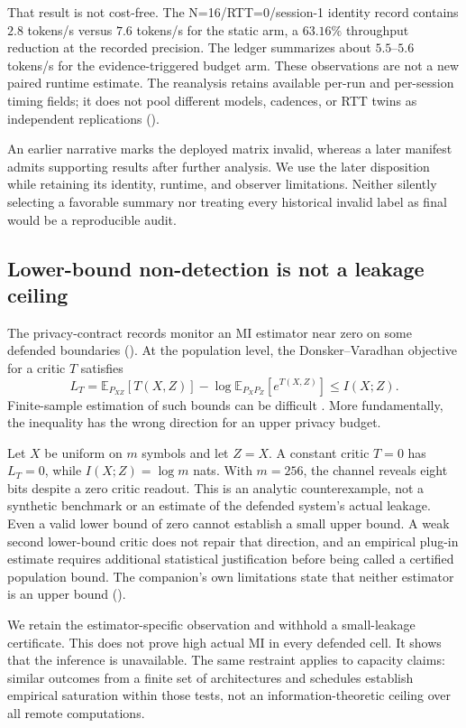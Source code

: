 That result is not cost-free. The N=16/RTT=0/session-1 identity record
contains $2.8$ tokens/s versus $7.6$ tokens/s for the static arm, a
$63.16\%$ throughput reduction at the recorded precision. The ledger
summarizes about $5.5$--$5.6$ tokens/s for the evidence-triggered budget
arm. These observations are not a new paired runtime estimate. The
reanalysis retains available per-run and
per-session timing fields; it does not pool different models, cadences,
or RTT twins as independent replications ().

An earlier narrative marks the deployed matrix invalid, whereas a later
manifest admits supporting results after further analysis. We use the
later disposition while retaining its identity, runtime, and observer
limitations. Neither silently selecting a favorable summary nor treating
every historical invalid label as final would be a reproducible audit.

\subsection{Lower-bound non-detection is not a leakage ceiling}

The privacy-contract records monitor an MI estimator near zero on some
defended boundaries (). At the population level, the
Donsker--Varadhan objective for a critic $T$ satisfies
\begin{equation}
 L_T=\mathbb E_{P_{XZ}}[T(X,Z)]-
 \log\mathbb E_{P_XP_Z}[e^{T(X,Z)}]\le I(X;Z).
 \label{eq:dv}
\end{equation}
Finite-sample estimation of such bounds can be difficult
\citep{song2020,mcallester2020}. More fundamentally, the inequality has
the wrong direction for an upper privacy budget.

Let $X$ be uniform on $m$ symbols and let $Z=X$. A constant critic $T=0$
has $L_T=0$, while $I(X;Z)=\log m$ nats. With $m=256$, the channel
reveals eight bits despite a zero critic readout. This is an analytic
counterexample, not a synthetic benchmark or an estimate of the defended
system's actual leakage. Even a valid lower bound of zero cannot establish
a small upper bound. A weak second lower-bound critic does not repair
that direction, and an empirical plug-in estimate requires additional
statistical justification before being called a certified population bound.
The companion's own limitations state that neither estimator is an upper
bound ().

We retain the estimator-specific observation and withhold a small-leakage
certificate. This does not prove high actual MI in every defended cell.
It shows that the inference is unavailable. The same restraint applies
to capacity claims: similar outcomes from a finite set of architectures
and schedules establish empirical saturation within those tests, not an
information-theoretic ceiling over all remote computations.
